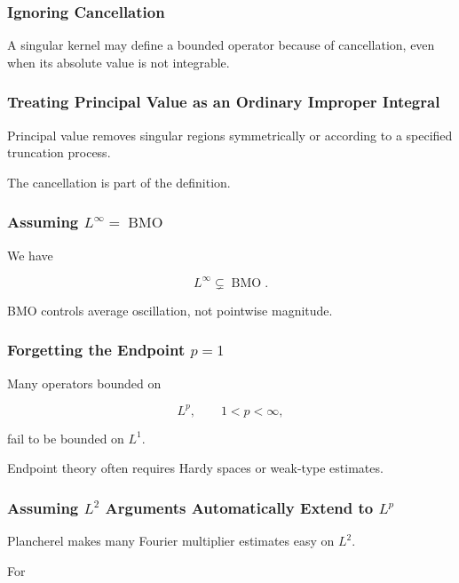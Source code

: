 \subsubsection{Ignoring Cancellation}

A singular kernel may define a bounded operator because of cancellation,
even when its absolute value is not integrable.

\subsubsection{Treating Principal Value as an Ordinary Improper Integral}

Principal value removes singular regions symmetrically or according to a
specified truncation process.

The cancellation is part of the definition.

\subsubsection{Assuming \(L^\infty=\operatorname{BMO}\)}

We have

\[
L^\infty
\subsetneq
\operatorname{BMO}.
\]

BMO controls average oscillation, not pointwise magnitude.

\subsubsection{Forgetting the Endpoint \(p=1\)}

Many operators bounded on

\[
L^p,
\qquad
1<p<\infty,
\]

fail to be bounded on \(L^1\).

Endpoint theory often requires Hardy spaces or weak-type estimates.

\subsubsection{Assuming \(L^2\) Arguments Automatically Extend to \(L^p\)}

Plancherel makes many Fourier multiplier estimates easy on \(L^2\).

For

